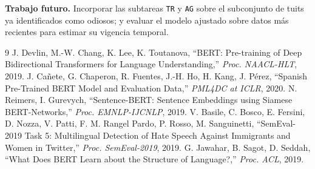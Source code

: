 \documentclass[conference]{IEEEtran}
\begin{document}
\textbf{Trabajo futuro.} Incorporar las subtareas \texttt{TR} y \texttt{AG} sobre el subconjunto de tuits ya identificados como odiosos; y evaluar el modelo ajustado sobre datos más recientes para estimar su vigencia temporal.

\begin{thebibliography}{9}
\small
\setlength{\itemsep}{0pt}
 J. Devlin, M.-W. Chang, K. Lee, K. Toutanova, ``BERT: Pre-training of Deep Bidirectional Transformers for Language Understanding,'' \textit{Proc. NAACL-HLT}, 2019.
 J. Cañete, G. Chaperon, R. Fuentes, J.-H. Ho, H. Kang, J. Pérez, ``Spanish Pre-Trained BERT Model and Evaluation Data,'' \textit{PML4DC at ICLR}, 2020.
 N. Reimers, I. Gurevych, ``Sentence-BERT: Sentence Embeddings using Siamese BERT-Networks,'' \textit{Proc. EMNLP-IJCNLP}, 2019.
 V. Basile, C. Bosco, E. Fersini, D. Nozza, V. Patti, F. M. Rangel Pardo, P. Rosso, M. Sanguinetti, ``SemEval-2019 Task 5: Multilingual Detection of Hate Speech Against Immigrants and Women in Twitter,'' \textit{Proc. SemEval-2019}, 2019.
 G. Jawahar, B. Sagot, D. Seddah, ``What Does BERT Learn about the Structure of Language?,'' \textit{Proc. ACL}, 2019.
\end{thebibliography}
\end{document}
